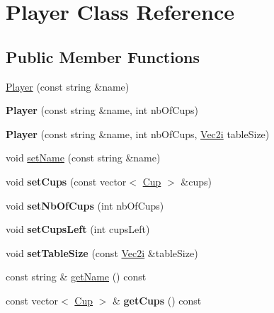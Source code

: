 \hypertarget{classPlayer}{}\section{Player Class Reference}
\label{classPlayer}
\subsection*{Public Member Functions}
\begin{DoxyCompactItemize}
\item 
\mbox{\hyperlink{classPlayer_a5a2790fccf10c30106370d910c96d317}{Player}} (const string \&name)
\item 
\mbox{\label{classPlayer_af7e9ada200fa94e37cff9031eed8576d}} 
{\bfseries Player} (const string \&name, int nb\+Of\+Cups)
\item 
\mbox{\label{classPlayer_a4f78f284a55b3b418c76573145ee3ae3}} 
{\bfseries Player} (const string \&name, int nb\+Of\+Cups, \mbox{\hyperlink{classVec2}{Vec2i}} table\+Size)
\item 
void \mbox{\hyperlink{classPlayer_ad2787badc3f3d990842e745a10eb972c}{set\+Name}} (const string \&name)
\item 
\mbox{\label{classPlayer_a1292de11606f8cdd7a2186dcb8fbe358}} 
void {\bfseries set\+Cups} (const vector$<$ \mbox{\hyperlink{classCup}{Cup}} $>$ \&cups)
\item 
\mbox{\label{classPlayer_a2133ab4f2136df0e0529a04e1c56aa23}} 
void {\bfseries set\+Nb\+Of\+Cups} (int nb\+Of\+Cups)
\item 
\mbox{\label{classPlayer_a7506a3bc61b29dd91d02995680a38f91}} 
void {\bfseries set\+Cups\+Left} (int cups\+Left)
\item 
\mbox{\label{classPlayer_a64af26d71501ac6c5b774eb4e8f547d2}} 
void {\bfseries set\+Table\+Size} (const \mbox{\hyperlink{classVec2}{Vec2i}} \&table\+Size)
\item 
const string \& \mbox{\hyperlink{classPlayer_afdd045ec6973c2e12a226d8976359182}{get\+Name}} () const
\item 
\mbox{\label{classPlayer_a0d542675ce7187bee90aabaa78afca70}} 
const vector$<$ \mbox{\hyperlink{classCup}{Cup}} $>$ \& {\bfseries get\+Cups} () const

\end{DoxyCompactItemize}
